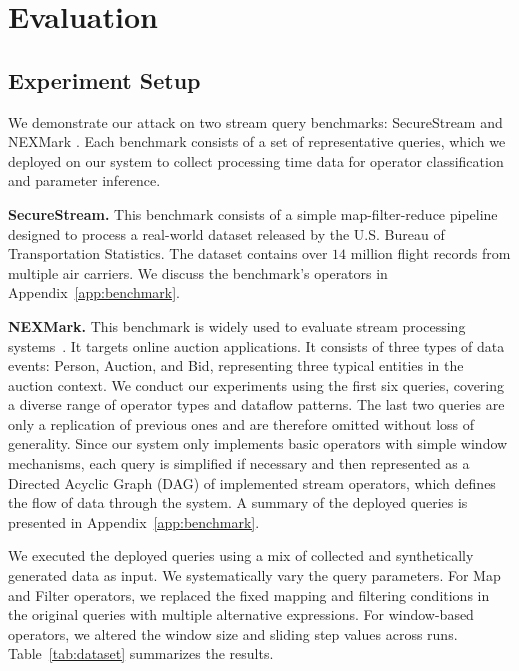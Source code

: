 \section{Evaluation}
\label{sec:experiments}
\subsection{Experiment Setup}

We demonstrate our attack on two stream query benchmarks:  SecureStream \cite{DBLP:journals/corr/abs-1805-01752} and NEXMark \cite{nexmark}. Each benchmark consists of a set of representative queries, which we deployed on our system to collect processing time data for operator classification and parameter inference.

\noindent \textbf{SecureStream.} This benchmark consists of a simple map-filter-reduce pipeline designed to process a real-world dataset released by the U.S. Bureau of Transportation Statistics. The dataset contains over $14$ million flight records from multiple air carriers. We discuss the benchmark's operators in Appendix~\ref{app:benchmark}. 

\noindent \textbf{NEXMark.} This benchmark is widely used to evaluate stream processing systems~\cite{begoli2019one,hoffmann2019megaphone,sponge2023,Meces2022,three_step_2018}. It targets online auction applications. It consists of three types of data events: Person, Auction, and Bid, representing three typical entities in the auction context. We conduct our experiments using the first six queries, covering a diverse range of operator types and dataflow patterns. The last two queries are only a replication of previous ones and are therefore omitted without loss of generality. Since our system only implements basic operators with simple window mechanisms, each query is simplified if necessary and then represented as a Directed Acyclic Graph (DAG) of implemented stream operators, which defines the flow of data through the system. A summary of the deployed queries is presented in Appendix~\ref{app:benchmark}. 

  We executed the deployed queries using a mix of collected and synthetically generated data as input. We systematically vary the query parameters. For Map and Filter operators, we replaced the fixed mapping and filtering conditions in the original queries with multiple alternative expressions. For window-based operators, we altered the window size and sliding step values across runs. Table~\ref{tab:dataset} summarizes the results. 

